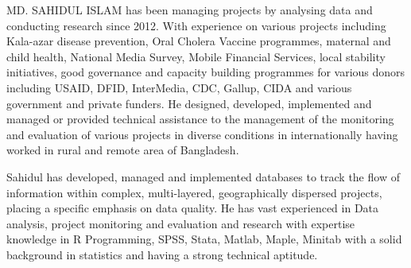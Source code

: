 

\begin{cvparagraph}


MD. SAHIDUL ISLAM has been managing projects by analysing data and conducting research since 2012. With experience on various projects including Kala-azar disease prevention, Oral Cholera Vaccine programmes, maternal and child health, National Media Survey, Mobile Financial Services, local stability initiatives, good governance and capacity building programmes for various donors including USAID, DFID, InterMedia, CDC, Gallup, CIDA and various government and private funders. He designed, developed, implemented and managed or provided technical assistance to the management of the monitoring and evaluation of various projects in diverse conditions in internationally having worked in rural and remote area of Bangladesh.

Sahidul has developed, managed and implemented databases to track the flow of information within complex, multi-layered, geographically dispersed projects, placing a specific emphasis on data quality. He has vast experienced in Data analysis, project monitoring and evaluation and research with expertise knowledge in R Programming, SPSS, Stata, Matlab, Maple, Minitab with a solid background in statistics and having a strong technical aptitude.
\end{cvparagraph}
